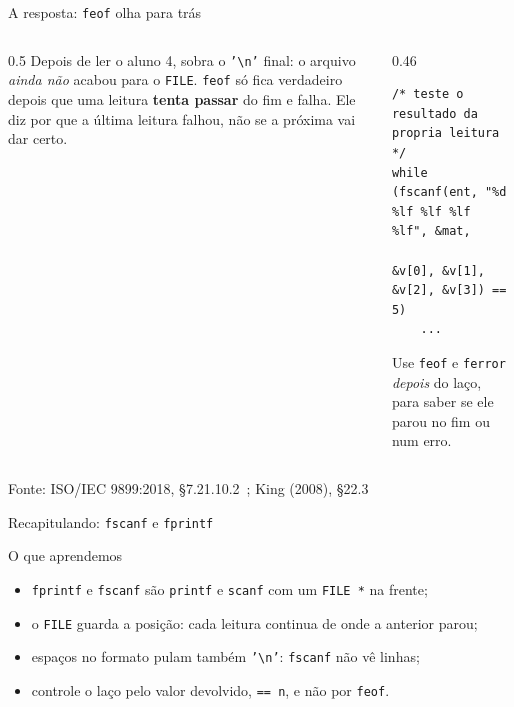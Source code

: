 \documentclass[aspectratio=169]{beamer}
\newcommand{\fonte}[1]{\vfill\hfill{\scriptsize\textcolor{UFSGray}{Fonte: #1}}}
\begin{document}
\begin{frame}[fragile]{A resposta: \texttt{feof} olha para trás}
  \begin{center}
  \end{center}
  \vspace{-0.3em}
  \begin{columns}[T]
    \begin{column}{0.5\textwidth}
      \small Depois de ler o aluno 4, sobra o \texttt{'\textbackslash n'}
      final: o arquivo \emph{ainda não} acabou para o \texttt{FILE}.
      \texttt{feof} só fica verdadeiro depois que uma leitura
      \textbf{tenta passar} do fim e falha. Ele diz por que a última
      leitura falhou, não se a próxima vai dar certo.
    \end{column}
    \begin{column}{0.46\textwidth}
\begin{lstlisting}[style=codCs]
/* teste o resultado da propria leitura */
while (fscanf(ent, "%d %lf %lf %lf %lf", &mat,
              &v[0], &v[1], &v[2], &v[3]) == 5)
    ...
\end{lstlisting}
      \small Use \texttt{feof} e \texttt{ferror} \emph{depois} do laço,
      para saber se ele parou no fim ou num erro.
    \end{column}
  \end{columns}
  \fonte{ISO/IEC 9899:2018, §7.21.10.2~\cite{iso2018c17};
    King (2008), §22.3~\cite{king2008c}}
\end{frame}

\begin{frame}{Recapitulando: \texttt{fscanf} e \texttt{fprintf}}
  \begin{block}{O que aprendemos}
    \begin{itemize}
      \item \texttt{fprintf} e \texttt{fscanf} são \texttt{printf} e
        \texttt{scanf} com um \texttt{FILE *} na frente;
      \item o \texttt{FILE} guarda a posição: cada leitura continua de onde
        a anterior parou;
      \item espaços no formato pulam também \texttt{'\textbackslash n'}:
        \texttt{fscanf} não vê linhas;
      \item controle o laço pelo valor devolvido, \texttt{== n}, e não por
        \texttt{feof}.
    \end{itemize}
  \end{block}
\end{frame}
\end{document}
